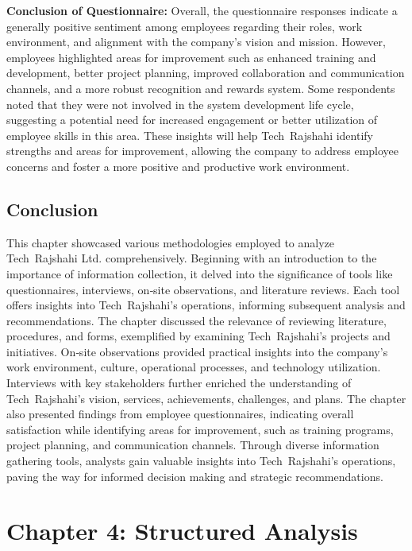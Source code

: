 \documentclass[12pt,a4paper]{article}
\begin{document}
\textbf{Conclusion of Questionnaire:}  Overall, the questionnaire responses indicate a generally positive sentiment among employees regarding their roles, work environment, and alignment with the company’s vision and mission.  However, employees highlighted areas for improvement such as enhanced training and development, better project planning, improved collaboration and communication channels, and a more robust recognition and rewards system.  Some respondents noted that they were not involved in the system development life cycle, suggesting a potential need for increased engagement or better utilization of employee skills in this area.  These insights will help Tech Rajshahi identify strengths and areas for improvement, allowing the company to address employee concerns and foster a more positive and productive work environment.

\subsection{Conclusion}
This chapter showcased various methodologies employed to analyze Tech Rajshahi Ltd. comprehensively.  Beginning with an introduction to the importance of information collection, it delved into the significance of tools like questionnaires, interviews, on‑site observations, and literature reviews.  Each tool offers insights into Tech Rajshahi’s operations, informing subsequent analysis and recommendations.  The chapter discussed the relevance of reviewing literature, procedures, and forms, exemplified by examining Tech Rajshahi’s projects and initiatives.  On‑site observations provided practical insights into the company’s work environment, culture, operational processes, and technology utilization.  Interviews with key stakeholders further enriched the understanding of Tech Rajshahi’s vision, services, achievements, challenges, and plans.  The chapter also presented findings from employee questionnaires, indicating overall satisfaction while identifying areas for improvement, such as training programs, project planning, and communication channels.  Through diverse information gathering tools, analysts gain valuable insights into Tech Rajshahi’s operations, paving the way for informed decision making and strategic recommendations.

\newpage

\section{Chapter 4: Structured Analysis}
\end{document}
